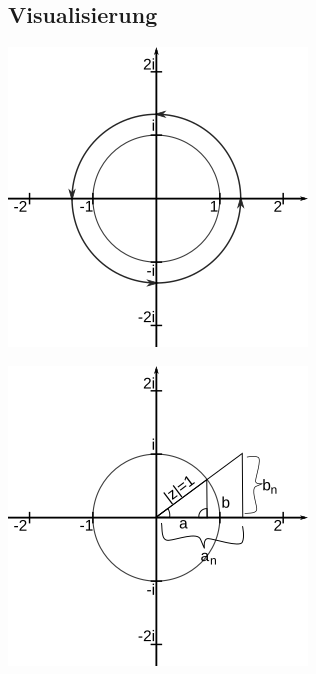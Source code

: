 \documentclass[german]{latex4ei/latex4ei_sheet}
\begin{document}
\begin{sectionbox}
\subsection{Visualisierung}
\begin{minipage}{0.49\textwidth}
	\includegraphics[width=\textwidth]{img/einheitskreis_komplexe_zahlen.png}
\end{minipage}
\begin{minipage}{0.49\textwidth}
	\includegraphics[width=\textwidth]{img/visualisierung_komplexe_zahlen.png}
\end{minipage}


\end{sectionbox}
\end{document}
